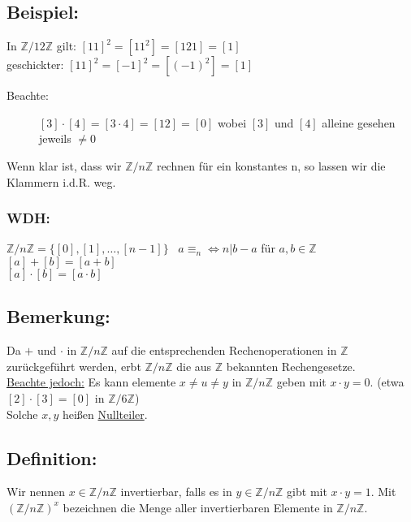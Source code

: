 \subsection{Beispiel:} In $ \mathbb{Z}/12\mathbb{Z}$ gilt: $[11]^{2} = [11^{2}] = [121] = [1]$\\
				geschickter: $[11]^{2} = [-1]^{2} = [(-1)^{2}] = [1]$
\begin{description}
	\item[Beachte:] $[3] \cdot [4] = [3\cdot4] = [12] = [0]$ wobei $[3]$ und $[4]$ alleine gesehen jeweils $\neq 0$
\end{description}
Wenn klar ist, dass wir $\mathbb{Z}/n\mathbb{Z}$ rechnen für ein konstantes n, so lassen wir die Klammern i.d.R. weg.
%
%
%
\subsubsection{WDH:} $\mathbb{Z}/n\mathbb{Z} = \{ [0], [1], \dotsc, [n-1]\}$ \ $a \equiv_{n} \Leftrightarrow n|b-a$ für $a,b \in \mathbb{Z}$\\
$[a] + [b] = [a+b]$\\
$[a] \cdot [b] = [a \cdot b]$
%
%
%
\subsection{Bemerkung:}
Da $ + $ und $ \cdot $ in $\mathbb{Z}/n\mathbb{Z}$  auf die entsprechenden Rechenoperationen in $\mathbb{Z}$ zurückgeführt werden, erbt $\mathbb{Z}/n\mathbb{Z}$ die aus $\mathbb{Z}$ bekannten Rechengesetze.\\
\underline{Beachte jedoch:} Es kann elemente $x \neq u \neq y$ in $\mathbb{Z}/n\mathbb{Z}$ geben mit $x \cdot y = 0$. (etwa $[2] \cdot [3] = [0]$ in $\mathbb{Z}/6\mathbb{Z}$)\\
Solche $x,y$ heißen \underline{Nullteiler}. 
%
%
%
\subsection{Definition:} 
Wir nennen $x \in \mathbb{Z}/n\mathbb{Z}$ invertierbar, falls es in $y \in \mathbb{Z}/n\mathbb{Z}$ gibt mit $x \cdot y = 1$. Mit $(\mathbb{Z}/n\mathbb{Z})^{x}$ bezeichnen die Menge aller invertierbaren Elemente in $\mathbb{Z}/n\mathbb{Z}$. 
%
%
%
